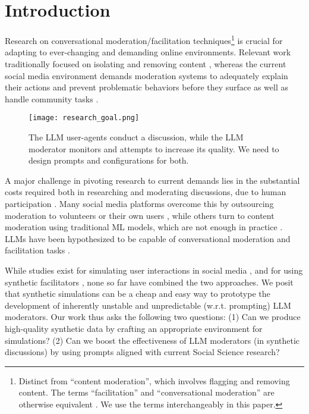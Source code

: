 %
\section{Introduction}
\label{sec:introduction}

Research on conversational moderation/facilitation techniques\footnote{Distinct from “content moderation”, which involves flagging and removing content. The terms “facilitation” and “conversational moderation” are otherwise equivalent \cite{argyle2023, korre2025evaluation, falk-etal-2021-predicting}. We use the terms interchangeably in this paper.} is crucial for adapting to ever-changing and demanding online environments. Relevant work traditionally focused on isolating and removing content \cite{seering_self_moderation, cresci_pesonalized_interventions}, whereas the current social media environment demands moderation systems to adequately explain their actions and prevent problematic behaviors before they surface \cite{cho-etal-2024-language, seering_self_moderation, cresci_pesonalized_interventions, make_reddit_great} as well as handle community tasks \cite{kim_et_al_chatbot, seering_self_moderation}.

\begin{figure}[hbt!]
	\centering
	\texttt{[image: research\_goal.png]}
	\caption{The \ac{LLM} user-agents conduct a discussion, while the \ac{LLM} moderator monitors and attempts to increase its quality. We need to design prompts and configurations for both.}
	\label{fig::goals}
\end{figure}

A major challenge in pivoting research to current demands lies in the substantial costs required both in researching and moderating discussions, due to human participation \cite{rossi_2024}. Many social media platforms overcome this by outsourcing moderation to volunteers or their own users \cite{Matias2019TheCL, schaffner_community_guidelines}, while others turn to content moderation using traditional \ac{ML} models, which are not enough in practice \cite{horta_automated_moderation, schaffner_community_guidelines}. \acfp{LLM} have been hypothesized to be capable of conversational moderation and facilitation tasks \cite{small-polis-llm, korre2025evaluation}. 

While studies exist for simulating user interactions in social media \cite{park_simulacra, mou_2024, tornberg_2023, y_social, balog_2024}, and for using synthetic facilitators \cite{kim_et_al_chatbot, cho-etal-2024-language}, none so far have combined the two approaches. We posit that synthetic simulations can be a cheap and easy way to prototype the development of inherently unstable and unpredictable (w.r.t. prompting) \cite{atil_2025, rossi_2024} \ac{LLM} moderators. Our work thus asks the following two questions: (1) Can we produce high-quality synthetic data by crafting an appropriate environment for simulations? (2) Can we boost the effectiveness of \ac{LLM} moderators (in synthetic discussions) by using prompts aligned with current Social Science research?

